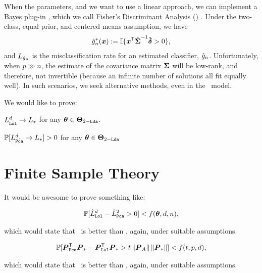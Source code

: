 \documentclass[10pt]{article}
\begin{document}
When the parameters, and we want to use a linear approach, we can implement a Bayes plug-in \Lda, which we call Fisher's Discriminant Analysis (\Fld) \cite{Fisher1925a}.  Under the two-class, equal prior, and centered means assumption, we have 
\begin{align}
\hat{g}^*_n(\boldsymbol{x}) := \mathbb{I}\{ \boldsymbol{x}^{\mathsf{T}} \hat{\boldsymbol{\Sigma}}^{-1} \hat{\boldsymbol{\delta}} > 0 \},
\end{align}
and $L_{\hat{g}_n}$ is the misclassification rate for an estimated classifier, $\hat{g}_n$.
Unfortunately, when $p \gg n$, the estimate of the covariance matrix $\boldsymbol{\Sigma}$ will be low-rank, and therefore, not invertible (because an infinite number of solutions all fit equally well).  In such scenarios, we seek alternative methods, even in the \Lda~model.

We would like to prove:
\begin{lem}
$L_{\hat{{\sc \texttt{Lol}}}}^d \rightarrow L_*$ for any $\boldsymbol{\theta} \in \boldsymbol{\Theta}_{2-{\sc \texttt{Lda}}}$.
\end{lem}


\begin{lem}
$\mathbb{P}[L_{\hat{{\sc \texttt{Pca}}}}^d \rightarrow L_*]>0$ for any $\boldsymbol{\theta} \in \boldsymbol{\Theta}_{2-{\sc \texttt{Lda}}}$
\end{lem}


\section{Finite Sample Theory}

It would be awesome to prove something like:
\begin{thm}
\begin{align*}
\mathbb{P}[ \hat{L}_{{\sc \texttt{Lol}}}^d - \hat{L}_{{\sc \texttt{Pca}}}^2  > 0  ] < f(\boldsymbol{\theta},d,n),
\end{align*}
\end{thm}
which would state that \Lol~is better than \Pca, again, under suitable assumptions.


\begin{thm}
\begin{align*}
\mathbb{P}[ \boldsymbol{P}_{{\sc \texttt{Pca}}} ^{\mathsf{T}} \boldsymbol{P}_*  - \boldsymbol{P}_{{\sc \texttt{Lol}}} ^{\mathsf{T}} \boldsymbol{P}_*  > t \left \lVert\boldsymbol{P}_A \right \rVert \left \lVert\boldsymbol{P}_* \right \rVert ] < f(t,p,d),
\end{align*}
\end{thm}
which would state that \Lol~is better than \Pca, again, under suitable assumptions.
\end{document}
